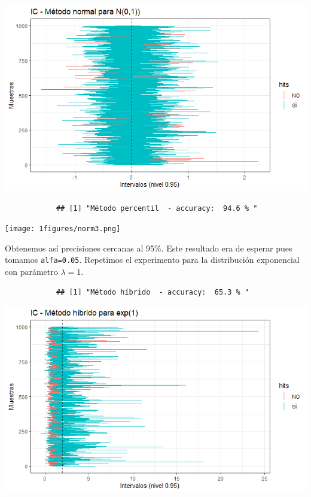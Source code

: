 \documentclass[a4paper]{article}
\begin{document}
		\includegraphics{figures/norm2.png}
		
		\begin{verbatim}
			## [1] "Método percentil  - accuracy:  94.6 % "
		\end{verbatim}
		
		\texttt{[image: 1figures/norm3.png]}
		
		Obtenemos así precisiones cercanas al 95\%. Este resultado era de
		esperar pues tomamos \texttt{alfa=0.05}. Repetimos el experimento para
		la distribución exponencial con parámetro \(\lambda=1\).
		
		\begin{Shaded}
			\begin{Highlighting}[]
				\StringTok{ }\NormalTok{(}\NormalTok{, }\NormalTok{, }\NormalTok{)}
				\NormalTok{(}
				\NormalTok{\}}
			\end{Highlighting}
		\end{Shaded}
		
		\begin{verbatim}
			## [1] "Método híbrido  - accuracy:  65.3 % "
		\end{verbatim}
		
		\includegraphics{figures/exp1.png}
		
\end{document}
